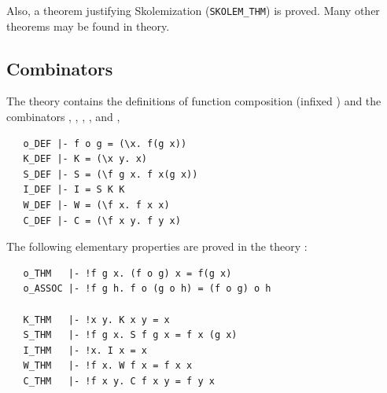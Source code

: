 Also, a theorem justifying Skolemization ({\small\verb+SKOLEM_THM+}) is
proved. Many other theorems may be found in  theory.

\subsection{Combinators}


The theory 
contains the definitions of function composition (infixed )
and the combinators
,
,
,
,
and ,

\begin{hol}
\begin{verbatim}
   o_DEF |- f o g = (\x. f(g x))
   K_DEF |- K = (\x y. x)
   S_DEF |- S = (\f g x. f x(g x))
   I_DEF |- I = S K K
   W_DEF |- W = (\f x. f x x)
   C_DEF |- C = (\f x y. f y x)
\end{verbatim}
\end{hol}

\noindent The following elementary properties are proved in the theory
:

\begin{hol}
\begin{verbatim}
   o_THM   |- !f g x. (f o g) x = f(g x)
   o_ASSOC |- !f g h. f o (g o h) = (f o g) o h

   K_THM   |- !x y. K x y = x
   S_THM   |- !f g x. S f g x = f x (g x)
   I_THM   |- !x. I x = x
   W_THM   |- !f x. W f x = f x x
   C_THM   |- !f x y. C f x y = f y x
\end{verbatim}
\end{hol}

